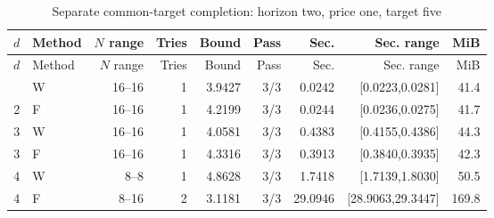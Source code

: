 {\small
\setlength{\tabcolsep}{3pt}
\begin{longtable}{@{}rlrrrrrrr@{}}
\caption{Separate common-target completion: horizon two, price one, target five}\label{tab:common50}\\
\toprule
$d$ & Method & $N$ range & Tries & Bound & Pass & Sec. & Sec. range & MiB \\
\midrule
\endfirsthead
\toprule
$d$ & Method & $N$ range & Tries & Bound & Pass & Sec. & Sec. range & MiB \\
\midrule
\endhead
\bottomrule
\endfoot
2 & W & 16--16 & 1 & 3.9427 & 3/3 & 0.0242 & [0.0223,0.0281] & 41.4 \\
2 & F & 16--16 & 1 & 4.2199 & 3/3 & 0.0244 & [0.0236,0.0275] & 41.7 \\
3 & W & 16--16 & 1 & 4.0581 & 3/3 & 0.4383 & [0.4155,0.4386] & 44.3 \\
3 & F & 16--16 & 1 & 4.3316 & 3/3 & 0.3913 & [0.3840,0.3935] & 42.3 \\
4 & W & 8--8 & 1 & 4.8628 & 3/3 & 1.7418 & [1.7139,1.8030] & 50.5 \\
4 & F & 8--16 & 2 & 3.1181 & 3/3 & 29.0946 & [28.9063,29.3447] & 169.8 \\
\end{longtable}
}
